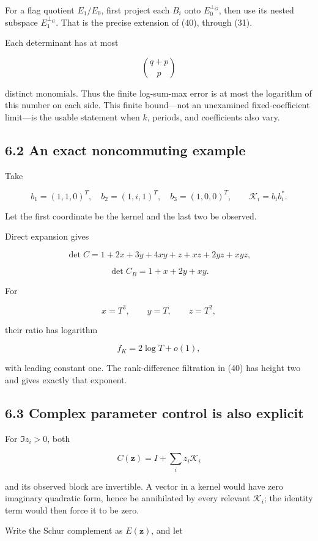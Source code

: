 \documentclass[11pt]{article}
\begin{document}
For a flag quotient \(E_1/E_0\), first project each \(B_i\) onto \(E_0^{\perp_G}\), then use its nested subspace \(E_1^{\perp_G}\). That is the precise extension of (40), through (31).

Each determinant has at most

\[
\binom{q+p}{p}
\]

distinct monomials. Thus the finite log-sum-max error is at most the logarithm of this number on each side. This finite bound---not an unexamined fixed-coefficient limit---is the usable statement when \(k\), periods, and coefficients also vary.

\subsection{6.2 An exact noncommuting example}\label{an-exact-noncommuting-example}

Take

\[
b_1=(1,1,0)^T,\quad
b_2=(1,i,1)^T,\quad
b_3=(1,0,0)^T,
\qquad
\mathcal K_i=b_ib_i^*.
\]

Let the first coordinate be the kernel and the last two be observed.

Direct expansion gives

\[
\det C
=
1+2x+3y+4xy+z+xz+2yz+xyz,
\]

\[
\det C_B=1+x+2y+xy.
\]

For

\[
x=T^3,\qquad y=T,\qquad z=T^2,
\]

their ratio has logarithm

\[
\boxed{f_K=2\log T+o(1),}
\tag{41}
\]

with leading constant one. The rank-difference filtration in (40) has height two and gives exactly that exponent.

\subsection{6.3 Complex parameter control is also explicit}\label{complex-parameter-control-is-also-explicit}

For \(\Im z_i>0\), both

\[
C(\mathbf z)=I+\sum_i z_i\mathcal K_i
\]

and its observed block are invertible. A vector in a kernel would have zero imaginary quadratic form, hence be annihilated by every relevant \(\mathcal K_i\); the identity term would then force it to be zero.

Write the Schur complement as \(E(\mathbf z)\), and let
\end{document}
